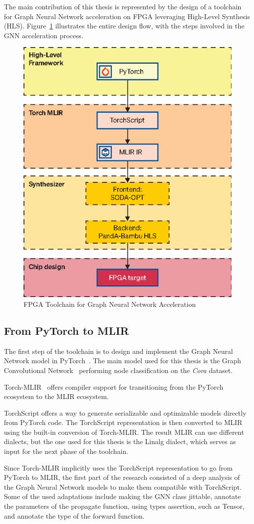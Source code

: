 \documentclass[11pt,a4paper,twocolumn]{article}
\begin{document}
The main contribution of this thesis is represented by the design of a toolchain for Graph Neural Network acceleration on FPGA leveraging High-Level Synthesis (HLS).
Figure~\ref{fig:toolchain} illustrates the entire design flow, with the steps involved in the GNN acceleration process.

\begin{figure}[t]
    \centering
    \includegraphics[height=0.36\textwidth]{Images/toolchain}
    \caption{FPGA Toolchain for Graph Neural Network Acceleration}
    \label{fig:toolchain}
\end{figure}

\subsection{From PyTorch to MLIR}
\label{subsec:pytorch-toolchain}%

The first step of the toolchain is to design and implement the Graph Neural Network model in PyTorch~\cite{DBLP:journals/corr/abs-1912-01703}.
The main model used for this thesis is the Graph Convolutional Network~\cite{DBLP:journals/corr/KipfW16} performing node classification on the \textit{Cora} dataset.

Torch-MLIR~\cite{torch_mlir} offers compiler support for transitioning from the PyTorch ecosystem to the MLIR ecosystem.

TorchScript offers a way to generate serializable and optimizable models directly from PyTorch code.
The TorchScript representation is then converted to MLIR using the built-in conversion of Torch-MLIR\@.
The result MLIR can use different dialects, but the one used for this thesis is the Linalg dialect, which serves as input for the next phase of the toolchain.

Since Torch-MLIR implicitly uses the TorchScript representation to go from PyTorch to MLIR, the first part of the research consisted of a deep analysis of the Graph Neural Network models to make them compatible with TorchScript.
Some of the used adaptations include making the GNN class jittable, annotate the parameters of the propagate function, using types assertion, such as Tensor, and annotate the type of the forward function.
\end{document}
